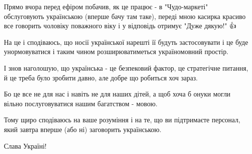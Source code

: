 Прямо вчора перед ефіром побачив, як це працює - в "Чудо-маркеті" обслуговують
українською (вперше бачу там таке), переді мною касирка красиво все говорить
чоловіку поважного віку і у відповідь отримує "Дуже дякую!" 👍 

На це і сподіваюсь, що носії української нарешті її будуть застосовувати і це
буде унормовуватися і таким чином розширюватиметься україномовний простір.

І знов наголошую, що українська - це безпековий фактор, це стратегічне питання,
й це треба було зробити давно, але добре що робиться хоч зараз. 

Бо це все не для нас і навіть не для наших дітей, а щоб хоча б онуки могли вільно послуговуватися нашим багатством - мовою.

Тому щиро сподіваюсь на ваше розуміння і на те, що ви підтримаєте персонал,
який завтра вперше (або ні) заговорить українською.

Слава Україні!
